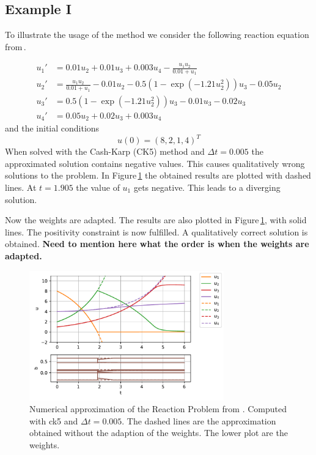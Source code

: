 \documentclass[a4paper]{article}
\numberwithin{equation}{section}
\theoremstyle{plain}
\theoremstyle{definition}
\numberwithin{theorem}{section}
\newcommand{\dt}{{\Delta t}}
\newcommand{\1}{\mathbbm{1}}
\begin{document}
\subsection{Example I}\label{sec:example_reac}

To illustrate the usage of the method we consider the following reaction equation from\,\cite{kopecz_comparison_2019}.

\begin{subequations}
\label{eq:Reaction}
\begin{align}
u_1' &= 0.01u_2 + 0.01 u_3 +0.003u_4 - \frac{u_1 u_2}{0.01+u_1} \\ 
u_2' &= \frac{u_1u_2}{0.01+u_1}-0.01 u_2-0.5(1-\exp(-1.21 u_2^2)) u_3 -0.05 u_2 \\ 
u_3' &= 0.5(1-\exp(-1.21u_2^2)) u_3 - 0.01 u_3 -0.02 u_3 \\ 
u_4' &=0.05 u_2 + 0.02 u_3 + 0.003u_4 
\end{align}
\end{subequations}
and the initial conditions
\begin{equation}
u(0) = (8,2,1,4)^T
\end{equation}
When solved with the Cash-Karp (CK5) method and $\dt = 0.005$ the approximated solution contains negative values. This causes qualitatively wrong solutions to the problem. 
In Figure\,\ref{fig:exampleI} the obtained results are plotted with dashed lines. 
At $t=1.905$ the value of $u_1$ gets negative. This leads to a diverging solution.

Now the weights are adapted. The results are also plotted in Figure\,\ref{fig:exampleI}, with solid lines. 
The positivity constraint is now fulfilled. A qualitatively correct solution is obtained.
{\bf Need to mention here what the order is when the weights are adapted.}

\begin{figure}[h]
    \centering
    \includegraphics[width=0.75\textwidth]{plots/exampleI.pdf}
    \caption{Numerical approximation of the Reaction Problem from \cite{kopecz_comparison_2019}. Computed with ck5 and $\dt = 0.005$. The dashed lines are the approximation obtained without the adaption of the weights. The lower plot are the weights. }
    \label{fig:exampleI}
\end{figure}
\end{document}
